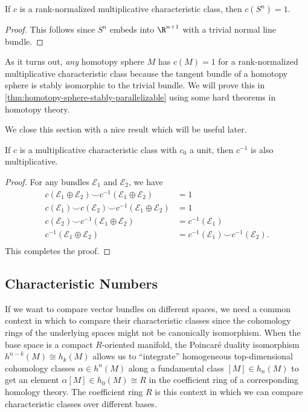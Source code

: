 \begin{corollary}
	If $c$ is a rank-normalized multiplicative characteristic class, then $c(S^n)=1$.
\end{corollary}
\begin{proof}
	This follows since $S^n$ embeds into $\R^{n+1}$ with a trivial normal line bundle.
\end{proof}

\begin{remark}
	As it turns out, \emph{any} homotopy sphere $M$ has $c(M)=1$ for a rank-normalized multiplicative characteristic class because the tangent bundle of a homotopy sphere is stably isomorphic to the trivial bundle. We will prove this in \cref{thm:homotopy-sphere-stably-parallelizable} using some hard theorems in homotopy theory.
\end{remark}

We close this section with a nice result which will be useful later.
\begin{proposition}\label{prop:multiplicative-inverse-is-multiplicative}
	If $c$ is a multiplicative characteristic class with $c_0$ a unit, then $c^{-1}$ is also multiplicative.
\end{proposition}
\begin{proof}
	For any bundles $\mathcal{E}_1$ and $\mathcal{E}_2$, we have
	\begin{equation}\label{eq:chern-inverse-is-multiplicative}
		\begin{aligned}
			c(\mathcal{E}_1\oplus \mathcal{E}_2)\smile c^{-1}(\mathcal{E}_1\oplus \mathcal{E}_2) &= 1\\
			c(\mathcal{E}_1)\smile c(\mathcal{E}_2)\smile c^{-1}(\mathcal{E}_1\oplus \mathcal{E}_2) &= 1\\
			c(\mathcal{E}_2)\smile
			c^{-1}(\mathcal{E}_1\oplus \mathcal{E}_2) &= c^{-1}(\mathcal{E}_1)\\
			c^{-1}(\mathcal{E}_1\oplus \mathcal{E}_2) &= c^{-1}(\mathcal{E}_1)\smile c^{-1}(\mathcal{E}_2).\\
		\end{aligned}
		\end{equation}
		This completes the proof.
\end{proof}

\subsection{Characteristic Numbers}

If we want to compare vector bundles on different spaces, we need a common context in which to compare their characteristic classes since the cohomology rings of the underlying spaces might not be canonically isomorphism. When the base space is a compact $R$-oriented manifold, the Poincar\'e duality isomorphism $h^{n-k}(M) \cong h_k(M)$ allows us to ``integrate'' homogeneous top-dimensional cohomology classes $\alpha\in h^{n}(M)$ along a fundamental class $[M]\in h_n(M)$ to get an element $\alpha[M]\in h_0(M)\cong R$ in the coefficient ring of a corresponding homology theory. The coefficient ring $R$ is this context in which we can compare characteristic classes over different bases.

